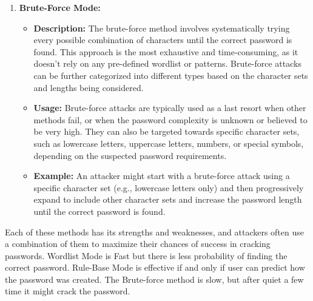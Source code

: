 \documentclass[12pt, A4Paper]{article}
\begin{document}
\begin{enumerate}
    \item \textbf{Brute-Force Mode:}
    \begin{itemize}
        \item \textbf{Description:} The brute-force method involves systematically trying every possible combination of characters until the correct password is found. This approach is the most exhaustive and time-consuming, as it doesn't rely on any pre-defined wordlist or patterns. Brute-force attacks can be further categorized into different types based on the character sets and lengths being considered.
        \item \textbf{Usage:} Brute-force attacks are typically used as a last resort when other methods fail, or when the password complexity is unknown or believed to be very high. They can also be targeted towards specific character sets, such as lowercase letters, uppercase letters, numbers, or special symbols, depending on the suspected password requirements.
        \item \textbf{Example:} An attacker might start with a brute-force attack using a specific character set (e.g., lowercase letters only) and then progressively expand to include other character sets and increase the password length until the correct password is found.
    \end{itemize}
\end{enumerate}
Each of these methods has its strengths and weaknesses, and attackers often use a combination of them to maximize their chances of success in cracking passwords. Wordlist Mode is Fast but there is less probability of finding the correct password. Rule-Base Mode is effective if and only if user can predict how the password was created. The Brute-force method is slow, but after quiet a few time it might crack the password.
\vspace{2.5cm}

\newpage
\end{document}
